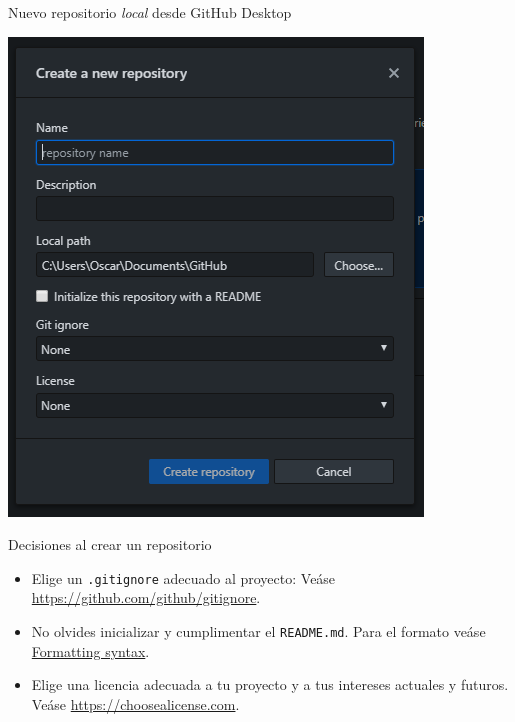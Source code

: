 \documentclass[xcolor={usenames,svgnames,dvipsnames}]{beamer}
\begin{document}
\begin{frame}[label={sec:orgaa8ca38}]{Nuevo repositorio \emph{local} desde GitHub Desktop}
\begin{center}
\end{center}

\begin{center}
\includegraphics[height=0.7\textheight]{figs/Desktop_NewRepository.png}
\end{center}
\end{frame}

\begin{frame}[label={sec:org31f89b5},fragile]{Decisiones al crear un repositorio}
 \begin{itemize}
\item Elige un \alert{\texttt{.gitignore}} adecuado al proyecto: Veáse \url{https://github.com/github/gitignore}.
\item No olvides inicializar y cumplimentar el \alert{\texttt{README.md}}. Para el formato veáse \href{https://help.github.com/articles/basic-writing-and-formatting-syntax/}{Formatting syntax}.
\item Elige una \alert{licencia} adecuada a tu proyecto y a tus intereses actuales y futuros. Veáse \url{https://choosealicense.com}.
\end{itemize}
\end{frame}
\end{document}
